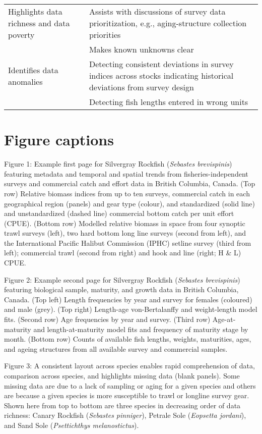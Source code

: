 \documentclass[12pt,]{article}
\begin{document}
\begin{table}
\begin{tabular}[t]{>{\raggedright\arraybackslash}p{6.2cm}>{\raggedright\arraybackslash}p{9.7cm}}
\addlinespace
Highlights data richness and data poverty & Assists with discussions of survey data prioritization, e.g., aging-structure collection priorities\\
\addlinespace
 & Makes known unknowns clear\\
\addlinespace
Identifies data anomalies & Detecting consistent deviations in survey indices across stocks indicating historical deviations from survey design\\
\addlinespace
 & Detecting fish lengths entered in wrong units\\
\bottomrule
\end{tabular}
\end{table}

\clearpage

\hypertarget{figure-captions}{%
\section*{Figure captions}\label{figure-captions}}

Figure 1: Example first page for Silvergray Rockfish (\emph{Sebastes brevispinis}) featuring metadata and temporal and spatial trends from fisheries-independent surveys and commercial catch and effort data in British Columbia, Canada. (Top row) Relative biomass indices from up to ten surveys, commercial catch in each geographical region (panels) and gear type (colour), and standardized (solid line) and unstandardized (dashed line) commercial bottom catch per unit effort (CPUE). (Bottom row) Modelled relative biomass in space from four synoptic trawl surveys (left), two hard bottom long line surveys (second from left), and the International Pacific Halibut Commission (IPHC) setline survey (third from left); commercial trawl (second from right) and hook and line (right; H \& L) CPUE.

Figure 2: Example second page for Silvergray Rockfish (\emph{Sebastes brevispinis}) featuring biological sample, maturity, and growth data in British Columbia, Canada. (Top left) Length frequencies by year and survey for females (coloured) and male (grey). (Top right) Length-age von-Bertalanffy and weight-length model fits. (Second row) Age frequencies by year and survey. (Third row) Age-at-maturity and length-at-maturity model fits and frequency of maturity stage by month. (Bottom row) Counts of available fish lengths, weights, maturities, ages, and ageing structures from all available survey and commercial samples.

Figure 3: A consistent layout across species enables rapid comprehension of data,
comparison across species, and highlights missing data (blank panels). Some
missing data are due to a lack of sampling or aging for a given species and
others are because a given species is more susceptible to trawl or longline
survey gear. Shown here from top to bottom are three species in decreasing order
of data richness: Canary Rockfish (\emph{Sebastes
pinniger}), Petrale Sole (\emph{Eopsetta jordani}), and Sand Sole
(\emph{Psettichthys melanostictus}).
\end{document}
